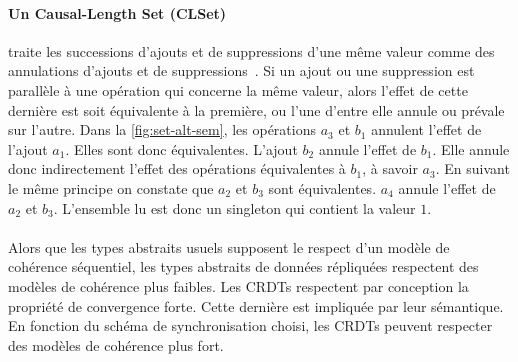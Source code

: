\paragraph{Un Causal-Length Set (CLSet)~\autocite{yu2020_clset}} traite les successions d'ajouts et de suppressions d'une même valeur comme des annulations d'ajouts et de suppressions~\autocite{2019_yu_genericundo}.
Si un ajout ou une suppression est parallèle à une opération qui concerne la même valeur, alors l'effet de cette dernière est soit équivalente à la première, ou l'une d'entre elle annule ou prévale sur l'autre.
Dans la \autoref{fig:set-alt-sem}, les opérations $a_3$ et $b_1$ annulent l'effet de l'ajout $a_1$.
Elles sont donc équivalentes.
L'ajout $b_2$ annule l'effet de $b_1$.
Elle annule donc indirectement l'effet des opérations équivalentes à $b_1$, à savoir $a_3$.
En suivant le même principe on constate que $a_2$ et $b_3$ sont équivalentes.
$a_4$ annule l'effet de $a_2$ et $b_3$.
L'ensemble lu est donc un singleton qui contient la valeur $1$.

\paragraph{} Alors que les types abstraits usuels supposent le respect d'un modèle de cohérence séquentiel, les types abstraits de données répliquées respectent des modèles de cohérence plus faibles.
Les \acp{CRDT} respectent par conception la propriété de convergence forte.
Cette dernière est impliquée par leur sémantique.
En fonction du schéma de synchronisation choisi, les \acp{CRDT} peuvent respecter des modèles de cohérence plus fort.



